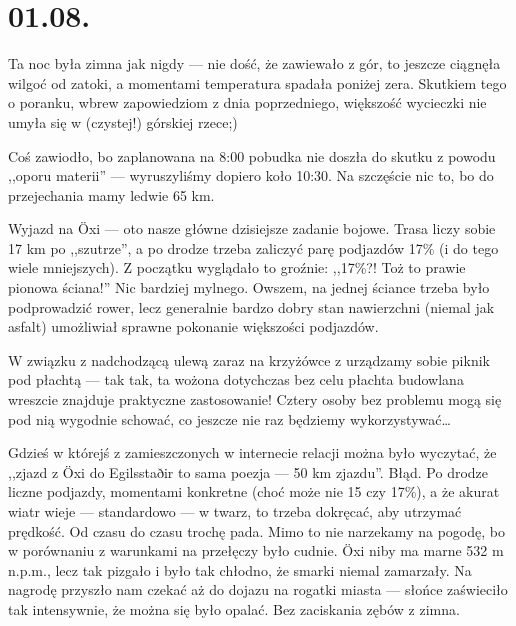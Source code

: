 \chapter*{01.08.}

Ta noc była zimna jak nigdy --- nie dość, że zawiewało z gór, to jeszcze ciągnęła wilgoć od zatoki, a momentami temperatura spadała poniżej zera. Skutkiem tego o poranku, wbrew zapowiedziom z dnia poprzedniego, większość wycieczki nie umyła się w (czystej!) górskiej rzece;)


Coś zawiodło, bo zaplanowana na 8:00 pobudka nie doszła do skutku z powodu ,,oporu materii'' --- wyruszyliśmy dopiero koło 10:30. Na szczęście nic to, bo do przejechania mamy ledwie 65 km.

Wyjazd na Öxi --- oto nasze główne dzisiejsze zadanie bojowe. Trasa liczy sobie 17 km po ,,szutrze'', a po drodze trzeba zaliczyć parę podjazdów 17\% (i do tego wiele mniejszych). Z początku wyglądało to groźnie: ,,17\%?! Toż to prawie pionowa ściana!'' Nic bardziej mylnego. Owszem, na jednej ściance trzeba było podprowadzić rower, lecz generalnie bardzo dobry stan nawierzchni (niemal jak asfalt) umożliwiał sprawne pokonanie większości podjazdów.


W związku z nadchodzącą ulewą zaraz na krzyżówce z  urządzamy sobie piknik pod płachtą --- tak tak, ta wożona dotychczas bez celu płachta budowlana wreszcie znajduje praktyczne zastosowanie! Cztery osoby bez problemu mogą się pod nią wygodnie schować, co jeszcze nie raz będziemy wykorzystywać…

Gdzieś w którejś z zamieszczonych w internecie relacji można było wyczytać, że ,,zjazd z Öxi do Egilsstaðir to sama poezja --- 50 km zjazdu''. Błąd. Po drodze liczne podjazdy, momentami konkretne (choć może nie 15 czy 17\%), a że akurat wiatr wieje --- standardowo --- w twarz, to trzeba dokręcać, aby utrzymać prędkość. Od czasu do czasu trochę pada. Mimo to nie narzekamy na pogodę, bo w porównaniu z warunkami na przełęczy było cudnie. Öxi niby ma marne 532 m n.p.m., lecz tak pizgało i było tak chłodno, że smarki niemal zamarzały. Na nagrodę przyszło nam czekać aż do dojazu na rogatki miasta --- słońce zaświeciło tak intensywnie, że można się było opalać. Bez zaciskania zębów z zimna.

